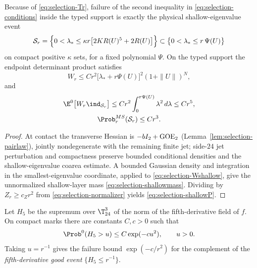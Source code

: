 \begin{lemma}\label{lem:selection-shallow}
Because of \eqref{eq:selection-Tr}, failure of the second inequality in \eqref{eq:selection-conditions} inside the typed support is exactly the physical shallow-eigenvalue event
\begin{equation}\label{eq:selection-shallow}
\mathcal S_r=\Bigl\{0<\lambda_*\le\kappa r\bigl[2KR(U)^5+2R(U)\bigr]\Bigr\}\subset\bigl\{0<\lambda_*\le r\,\Psi(U)\bigr\}
\end{equation}
on compact positive $\kappa$ sets, for a fixed polynomial $\Psi$. On the typed support the endpoint determinant product satisfies
\begin{equation}\label{eq:selection-Wshallow}
W_r\le Cr^2\bigl[\lambda_*+r\Psi(U)\bigr]^2(1+\|U\|)^N ,
\end{equation}
and
\begin{gather}
\E^0\bigl[W_r\ind_{\mathcal S_r}\bigr]\le Cr^2\int_0^{r\Psi(U)}\lambda^2\,d\lambda\le Cr^5,\label{eq:selection-shallowmass}\\
\Prob^{MS}_r(\mathcal S_r)\le Cr^3 .\label{eq:selection-shallowP}
\end{gather}
\end{lemma}

\begin{proof}
At contact the transverse Hessian is $-bI_2+{\rm GOE}_2$ (Lemma~\ref{lem:selection-pairlaw}), jointly nondegenerate with the remaining finite jet; side-$24$ jet perturbation and compactness preserve bounded conditional densities and the shallow-eigenvalue coarea estimate. A bounded Gaussian density and integration in the smallest-eigenvalue coordinate, applied to \eqref{eq:selection-Wshallow}, give the unnormalized shallow-layer mass \eqref{eq:selection-shallowmass}. Dividing by $Z_r\ge c_Zr^2$ from \eqref{eq:selection-normalizer} yields \eqref{eq:selection-shallowP}.
\end{proof}

\begin{lemma}\label{lem:selection-fifth}
Let $H_5$ be the supremum over $\T^3_{24}$ of the norm of the fifth-derivative field of $f$. On compact marks there are constants $C,c>0$ such that
\begin{equation}\label{eq:selection-borell}
\Prob^0(H_5>u)\le C\exp(-cu^2),\qquad u>0 .
\end{equation}
Taking $u=r^{-1}$ gives the failure bound $\exp(-c/r^2)$ for the complement of the \emph{fifth-derivative good event} $\{H_5\le r^{-1}\}$.
\end{lemma}

